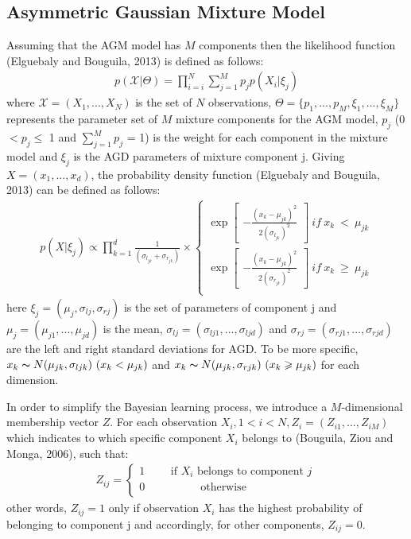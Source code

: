 \documentclass[conference]{llncs}
\begin{document}
\subsection{Asymmetric Gaussian Mixture Model}
Assuming that the AGM model has $M$ components then the likelihood function (Elguebaly and Bouguila, 2013)\cite{b4} is defined as follows:
\begin{align}
p(\mathcal{X}|\Theta) = \prod_{i=i}^N \sum_{j=1}^Mp_jp(X_i|\xi_j)
\label{eq:1}
\end{align}
where $\mathcal{X} = (X_1,...,X_N)$ is the set of $N$ observations, $\Theta = \{p_1,...,p_M, \xi_1,...,\xi_M\}$ represents the parameter set of $M$ mixture components for the AGM model, $p_j$ (0 $< p_j \leq$ 1 and $\sum_{j=1}^Mp_j$ = 1) is the weight for each component in the mixture model and $\xi_j$ is the AGD parameters of mixture component j. Giving $X = (x_1,...,x_d)$, the probability density function (Elguebaly and Bouguila, 2013)\cite{b4} can be defined as follows:
\begin{align}
p(X|\xi_j) \propto \prod_{k=1}^{d} \frac{1}{(\sigma_{l_{jk}}+\sigma_{r_{jk}})}
\times \left\{\begin{matrix}
\exp \begin{bmatrix}
-\frac{(x_k-\mu_{jk})^2}{2(\sigma_{l_{jk}})^2}
\end{bmatrix}\ if\ x_k\ <\ \mu_{jk} \\ 
\exp \begin{bmatrix}
-\frac{(x_k-\mu_{jk})^2}{2(\sigma_{r_{jk}})^2}
\end{bmatrix}\ if\ x_k\ \geqslant\ \mu_{jk} \\ 
\end{matrix}\right.
\label{eq:2}
\end{align}
here $\xi_j = (\mu_j,\sigma_{lj},\sigma_{rj})$ is the set of parameters of component j and $\mu_j = (\mu_{j1},...,\mu_{jd})$ is the mean, $\sigma_{lj} = (\sigma_{lj1},...,\sigma_{ljd})$ and $\sigma_{rj} = (\sigma_{rj1},...,\sigma_{rjd})$ are the left and right standard deviations for AGD. To be more specific, $x_k \thicksim N(\mu_{jk},\sigma_{ljk})\ (x_k < \mu_{jk})$ and $x_k \thicksim N(\mu_{jk},\sigma_{rjk})\ (x_k \geqslant \mu_{jk})$ for each dimension.

In order to simplify the Bayesian learning process, we introduce a $M$-dimensional membership vector $Z$. For each observation $X_i, 1 < i <N, Z_i = (Z_{i1},...,Z_{iM})$ which indicates to which specific component $X_i$ belongs to (Bouguila, Ziou and Monga, 2006)\cite{b10}, such that:
\begin{align}
Z_{ij} = \left\{\begin{matrix}
1\qquad\mbox{ if }X_i\mbox{  belongs to component }j \\
0\qquad\quad\qquad \mbox{otherwise} \qquad\qquad\quad\quad \\
\end{matrix}\right.
\label{eq:3}
\end{align}
other words, $Z_{ij} = 1$ only if observation $X_i$ has the highest probability of belonging to component j and accordingly, for other components, $Z_{ij} = 0$. 
\end{document}

